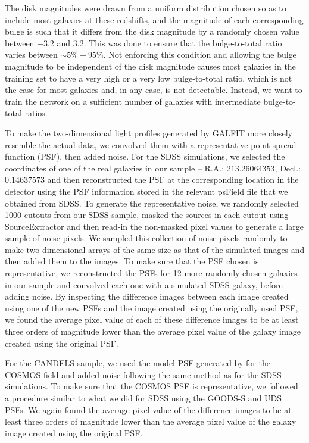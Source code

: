 \documentclass[twocolumn]{aastex63}
\begin{document}
The disk magnitudes were drawn from a uniform distribution chosen so as to include most galaxies at these redshifts, and the magnitude of each corresponding bulge is such that it differs from the disk magnitude by a randomly chosen value between $-3.2$ and $3.2$. This was done to ensure that the bulge-to-total ratio varies between $\sim 5\% - 95\%$. Not enforcing this condition and allowing the bulge magnitude to be independent of the disk magnitude causes most galaxies in the training set to have a very high or a very low bulge-to-total ratio, which is not the case for most galaxies and, in any case, is not detectable. Instead, we want to train the network on a sufficient number of galaxies with intermediate bulge-to-total ratios.  

To make the two-dimensional light profiles generated by GALFIT more closely resemble the actual data, we convolved them with a representative point-spread function (PSF), then added noise. For the SDSS simulations, we selected the coordinates of one of the real galaxies in our sample -- R.A.: $213.26064353$, Decl.: $0.14637573$ and then reconstructed the PSF at the corresponding location in the detector using the PSF information stored in the relevant psField file that we obtained from SDSS. To generate the representative noise, we randomly selected 1000 cutouts from our SDSS sample, masked the sources in each cutout using SourceExtractor \citep{s_extract} and then read-in the non-masked pixel values to generate a large sample of noise pixels. We sampled this collection of noise pixels randomly to make two-dimensional arrays of the same size as that of the simulated images and then added them to the images. To make sure that the PSF chosen is representative, we reconstructed the PSFs for 12 more randomly chosen galaxies in our sample and convolved each one with a simulated SDSS galaxy, before adding noise. By inspecting the difference images between each image created using one of the new PSFs and the image created using the originally used PSF, we found the average pixel value of each of these difference images to be at least three orders of magnitude lower than the average pixel value of the galaxy image created using the original PSF.


For the CANDELS sample, we used the model PSF generated by \citet{vdw_12} for the COSMOS field and added noise following the same method as for the SDSS simulations. To make sure that the COSMOS PSF is representative, we followed a procedure similar to what we did for SDSS using the GOODS-S and UDS PSFs. We again found the average pixel value of the difference images to be at least three orders of magnitude lower than the average pixel value of the galaxy image created using the original PSF. 
\end{document}
